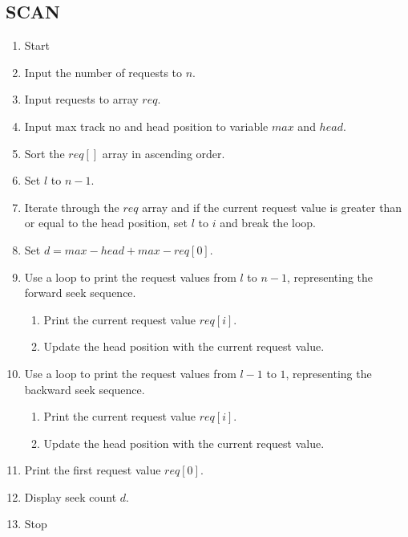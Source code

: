 \subsection{SCAN}
\begin{enumerate}
    \item Start
    \item Input the number of requests to $n$.
    \item Input requests to array $req$.
    \item Input max track no and head position to variable $max$ and $head$.
    \item Sort the $req[]$ array in ascending order.
    \item Set $l$ to $n-1$.
    \item Iterate through the $req$ array and if the current request value is greater than or equal to the head position, set $l$ to $i$ and break the loop.
    \item Set $d = max - head + max - req[0]$.
    \item Use a loop to print the request values from $l$ to $n-1$, representing the forward seek sequence.
    \begin{enumerate}
        \item Print the current request value $req[i]$.
        \item Update the head position with the current request value.
    \end{enumerate}
    \item Use a loop to print the request values from $l-1$ to $1$, representing the backward seek sequence.
    \begin{enumerate}
        \item Print the current request value $req[i]$.
        \item Update the head position with the current request value.
    \end{enumerate}
    \item Print the first request value $req[0]$.
    \item Display seek count $d$.
    \item Stop
\end{enumerate}

